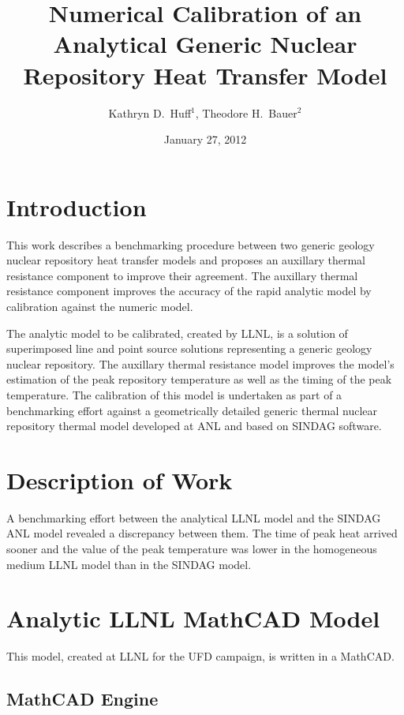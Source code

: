 \documentclass{anstrans}
\title{Numerical Calibration of an Analytical Generic Nuclear Repository Heat 
Transfer Model}
\author{Kathryn D.~Huff$^1$, Theodore H.~Bauer$^2$}
\institute{$^1$Nuclear Engineering \& Engineering Physics Dept., University of Wisconsin, Madison, WI, 53706\\
$^2$Nuclear Engineering Division, Argonne National Laboratory, Argonne, IL, 60439}
\date{January 27, 2012}
\begin{document}
\section{Introduction}

This work describes a benchmarking procedure between two generic geology nuclear 
repository heat transfer models and proposes an auxillary thermal resistance 
component to improve their agreement. The auxillary thermal resistance component 
improves the accuracy of the rapid analytic model by calibration against
the numeric model. 

The analytic model to be calibrated, created by \gls{LLNL}, is a solution of
superimposed line and point source solutions representing a generic geology 
nuclear repository. The auxillary thermal resistance model improves the model's 
estimation of the peak repository temperature as well as the timing of the peak 
temperature. The calibration of this model is undertaken as part of a 
benchmarking effort against a geometrically detailed generic thermal nuclear 
repository thermal model developed at \gls{ANL} and based on \gls{SINDAG} 
software.


\section{Description of Work}

A benchmarking effort between the analytical \gls{LLNL} model and the 
\gls{SINDAG} \gls{ANL} model revealed a discrepancy between them. The time of 
peak heat arrived sooner and the value of the peak temperature was lower in the 
homogeneous medium \gls{LLNL} model than in the \gls{SINDAG} model. 




\section{Analytic LLNL MathCAD Model}

This model, created at \gls{LLNL} for the \gls{UFD} campaign, is written in a 
MathCAD.

\subsection{MathCAD Engine}
\end{document}
